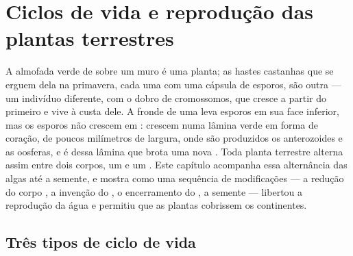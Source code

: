 \chapter{Ciclos de vida e reprodução das plantas terrestres}\label{ch:b2:plant-life-cycles}

A almofada verde de  sobre um muro é uma planta; as hastes
castanhas que se erguem dela na primavera, cada uma com uma cápsula de
esporos, são outra --- um indivíduo diferente, com o dobro de
cromossomos, que cresce a partir do primeiro e vive à custa dele. A
fronde de uma  leva esporos em sua face inferior, mas os
esporos não crescem em : crescem numa lâmina verde em forma
de coração, de poucos milímetros de largura, onde são produzidos os
anterozoides e as oosferas, e é dessa lâmina que brota uma nova
. Toda planta terrestre alterna assim entre dois corpos, um
 e um . Este capítulo acompanha essa alternância das
algas até a semente, e mostra como uma sequência de modificações ---
a redução do corpo , a invenção do , o encerramento do
, a semente --- libertou a reprodução da água e permitiu que as
plantas cobrissem os continentes.

\section{Três tipos de ciclo de vida}

